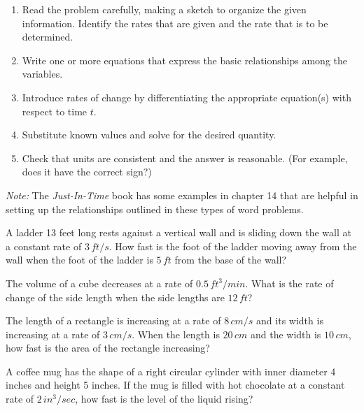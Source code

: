 \documentclass[../mathNotesPreamble]{subfiles}
\begin{document}
\begin{thmBox*}
  \begin{enumerate}
    \item Read the problem carefully, making a sketch to organize the given information. Identify the rates that are given and the rate that is to be determined.
    \item Write one or more equations that express the basic relationships among the variables.
    \item Introduce rates of change by differentiating the appropriate equation(s) with respect to time $t$.
    \item Substitute known values and solve for the desired quantity.
    \item Check that units are consistent and the answer is reasonable. (For example, does it have the correct sign?)
  \end{enumerate}
\end{thmBox*}

\textit{Note:} The \textit{Just-In-Time} book has some examples in chapter 14 that are helpful in setting up the relationships outlined in these types of word problems.
\pagebreak

\begin{ex*}
  A ladder 13 feet long rests against a vertical wall and is sliding down the wall at a constant rate of $3\,ft/s$. How fast is the foot of the ladder moving away from the wall when the foot of the ladder is $5\,ft$ from the base of the wall?
\end{ex*}
\pagebreak

\begin{ex*}
  The volume of a cube decreases at a rate of $0.5\,ft^3/min$. What is the rate of change of the side length when the side lengths are $12\,ft$?
\end{ex*}
\pagebreak

\begin{ex*}
  The length of a rectangle is increasing at a rate of $8\,cm/s$ and its width is increasing at a rate of $3\,cm/s$. When the length is $20\,cm$ and the width is $10\,cm$, how fast is the area of the rectangle increasing?
\end{ex*}
\pagebreak

\begin{ex*}
  A coffee mug has the shape of a right circular cylinder with inner diameter 4 inches and height 5 inches. If the mug is filled with hot chocolate at a constant rate of $2\,in^3/sec$, how fast is the level of the liquid rising?
\end{ex*}
\pagebreak
\end{document}
